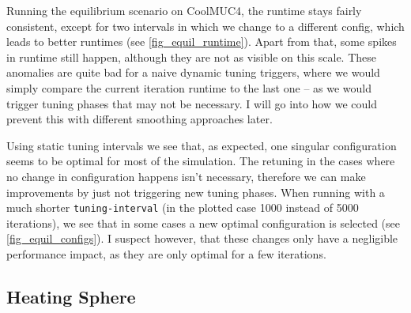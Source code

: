\documentclass[]{article}
\begin{document}
Running the equilibrium scenario on CoolMUC4, the runtime stays fairly consistent, except for two intervals in which we change to a different config, which leads to better runtimes (see \ref{fig_equil_runtime}). Apart from that, some spikes in runtime still happen, although they are not as visible on this scale. These anomalies are quite bad for a naive dynamic tuning triggers, where we would simply compare the current iteration runtime to the last one -- as we would trigger tuning phases that may not be necessary. I will go into how we could prevent this with different smoothing approaches later. %

Using static tuning intervals we see that, as expected, one singular configuration seems to be optimal for most of the simulation. The retuning in the cases where no change in configuration happens isn't necessary, therefore we can make improvements by just not triggering new tuning phases. When running with a much shorter \texttt{tuning-interval} (in the plotted case 1000 instead of 5000 iterations), we see that in some cases a new optimal configuration is selected (see \ref{fig_equil_configs}). I suspect however, that these changes only have a negligible performance impact, as they are only optimal for a few iterations.


%

\subsection{Heating Sphere}
\end{document}
